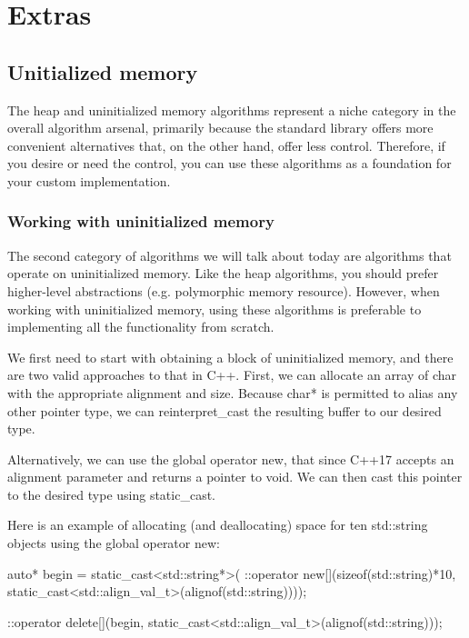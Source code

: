 \chapter{Extras}

\section{Unitialized memory}

The heap and uninitialized memory algorithms represent a niche category in the overall algorithm arsenal, primarily because the standard library offers more convenient alternatives that, on the other hand, offer less control. Therefore, if you desire or need the control, you can use these algorithms as a foundation for your custom implementation.

\subsection{Working with uninitialized memory}

The second category of algorithms we will talk about today are algorithms that operate on uninitialized memory. Like the heap algorithms, you should prefer higher-level abstractions (e.g. polymorphic memory resource). However, when working with uninitialized memory, using these algorithms is preferable to implementing all the functionality from scratch.

We first need to start with obtaining a block of uninitialized memory, and there are two valid approaches to that in C++. First, we can allocate an array of char with the appropriate alignment and size. Because char* is permitted to alias any other pointer type, we can reinterpret\_cast the resulting buffer to our desired type.

Alternatively, we can use the global operator new, that since C++17 accepts an alignment parameter and returns a pointer to void. We can then cast this pointer to the desired type using static\_cast.

Here is an example of allocating (and deallocating) space for ten std::string objects using the global operator new:

\begin{codebox}
\begin{cppcode}
auto* begin = static_cast<std::string*>(
                  ::operator new[](sizeof(std::string)*10, 
                                   static_cast<std::align_val_t>(alignof(std::string))));

::operator delete[](begin, static_cast<std::align_val_t>(alignof(std::string)));
\end{cppcode}
\end{codebox}

